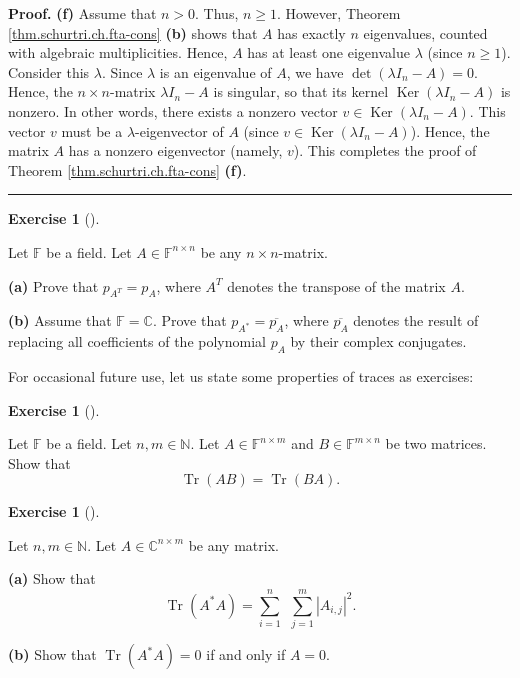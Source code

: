 \documentclass[numbers=enddot,12pt,final,onecolumn,notitlepage]{scrartcl}%
\newcounter{exer}
\numberwithin{exer}{subsection}
\theoremstyle{definition}
\newtheorem{exmp}[exer]{Exercise}
\newenvironment{exercise}[1][]
{\begin{exmp}[#1]\begin{leftbar}}
{\end{leftbar}\end{exmp}}
\newenvironment{proof}[1][Proof]{\noindent\textbf{#1.} }{\ \rule{0.5em}{0.5em}}
\let\sumnonlimits\sum
\renewcommand{\sum}{\sumnonlimits\limits}
\begin{document}
\begin{proof}
\textbf{(f)} Assume that $n>0$. Thus, $n\geq1$. However, Theorem
\ref{thm.schurtri.ch.fta-cons} \textbf{(b)} shows that $A$ has exactly $n$
eigenvalues, counted with algebraic multiplicities. Hence, $A$ has at least
one eigenvalue $\lambda$ (since $n\geq1$). Consider this $\lambda$. Since
$\lambda$ is an eigenvalue of $A$, we have $\det\left(  \lambda I_{n}%
-A\right)  =0$. Hence, the $n\times n$-matrix $\lambda I_{n}-A$ is singular,
so that its kernel $\operatorname*{Ker}\left(  \lambda I_{n}-A\right)  $ is
nonzero. In other words, there exists a nonzero vector $v\in
\operatorname*{Ker}\left(  \lambda I_{n}-A\right)  $. This vector $v$ must be
a $\lambda$-eigenvector of $A$ (since $v\in\operatorname*{Ker}\left(  \lambda
I_{n}-A\right)  $). Hence, the matrix $A$ has a nonzero eigenvector (namely,
$v$). This completes the proof of Theorem \ref{thm.schurtri.ch.fta-cons}
\textbf{(f)}.
\end{proof}

\begin{exercise}
 Let $\mathbb{F}$ be a field. Let $A\in\mathbb{F}^{n\times n}$ be any
$n\times n$-matrix. \medskip

\textbf{(a)} Prove that $p_{A^{T}}=p_{A}$, where $A^{T}$ denotes the transpose
of the matrix $A$. \medskip

\textbf{(b)} Assume that $\mathbb{F}=\mathbb{C}$. Prove that $p_{A^{\ast}%
}=\overline{p_{A}}$, where $\overline{p_{A}}$ denotes the result of replacing
all coefficients of the polynomial $p_{A}$ by their complex conjugates.
\end{exercise}

For occasional future use, let us state some properties of traces as exercises:

\begin{exercise}
\label{exe.trace.TrAB} Let $\mathbb{F}$ be a field. Let $n,m\in
\mathbb{N}$. Let $A\in\mathbb{F}^{n\times m}$ and $B\in\mathbb{F}^{m\times n}$
be two matrices. Show that%
\[
\operatorname*{Tr}\left(  AB\right)  =\operatorname*{Tr}\left(  BA\right)  .
\]

\end{exercise}

\begin{exercise}
\label{exe.trace.A*A=0} Let $n,m\in\mathbb{N}$. Let $A\in
\mathbb{C}^{n\times m}$ be any matrix. \medskip

\textbf{(a)} Show that
\[
\operatorname*{Tr}\left(  A^{\ast}A\right)  =\sum_{i=1}^{n}\ \ \sum_{j=1}%
^{m}\left\vert A_{i,j}\right\vert ^{2}.
\]


\textbf{(b)} Show that $\operatorname*{Tr}\left(  A^{\ast}A\right)  =0$ if and
only if $A=0$.
\end{exercise}
\end{document}

